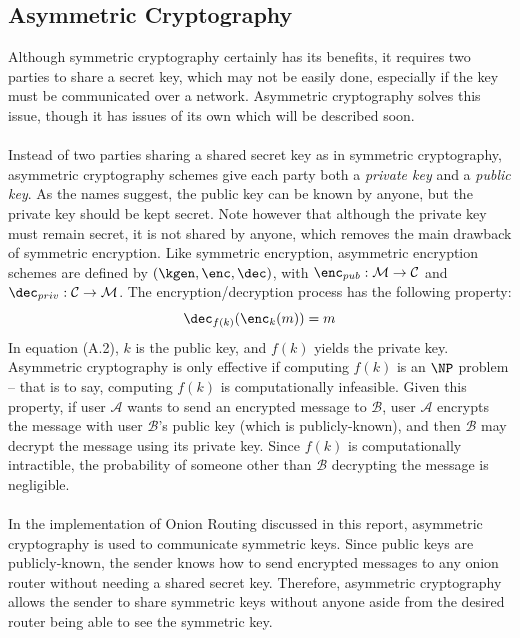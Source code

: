 \documentclass[10pt]{report}
\begin{document}
\begin{appendix}
	\section{Asymmetric Cryptography}
	Although symmetric cryptography certainly has its benefits, it requires two parties to share a
	secret key, which may not be easily done, especially if the key must be communicated over a
	network. Asymmetric cryptography solves this issue, though it has issues of its own which will
	be described soon.\\\\
	Instead of two parties sharing a shared secret key as in symmetric cryptography, asymmetric
	cryptography schemes give each party both a \textit{private key} and a \textit{public key}. As
	the names suggest, the public key can be known by anyone, but the private key should be kept
	secret. Note however that although the private key must remain secret, it is not shared by
	anyone, which removes the main drawback of symmetric encryption. Like symmetric encryption,
	asymmetric encryption schemes are defined by $(\kgen,\enc,\dec)$, with
	$\enc_{pub}:\mathcal{M}\rightarrow\mathcal{C}$ and
	$\dec_{priv}:\mathcal{C}\rightarrow\mathcal{M}$. The encryption/decryption process has the
	following property:
	\begin{equation}
		\dec_{f(k)}(\enc_{k}(m)) = m
	\end{equation}
	In equation (A.2), $k$ is the public key, and $f(k)$ yields the private key. Asymmetric
	cryptography is only effective if computing $f(k)$ is an $\NP$ problem -- that is to say,
	computing $f(k)$ is computationally infeasible. Given this property, if user $\mathcal{A}$ wants
	to send an encrypted message to $\mathcal{B}$, user $\mathcal{A}$ encrypts the message with user
	$\mathcal{B}$'s public key (which is publicly-known), and then $\mathcal{B}$ may decrypt the
	message using its private key. Since $f(k)$ is computationally intractible, the probability of
	someone other than $\mathcal{B}$ decrypting the message is negligible.\\\\
	In the implementation of Onion Routing discussed in this report, asymmetric cryptography is used
	to communicate symmetric keys. Since public keys are publicly-known, the sender knows how to
	send encrypted messages to any onion router without needing a shared secret key. Therefore,
	asymmetric cryptography allows the sender to share symmetric keys without anyone aside from the
	desired router being able to see the symmetric key.\\\\

\end{appendix}
\end{document}
